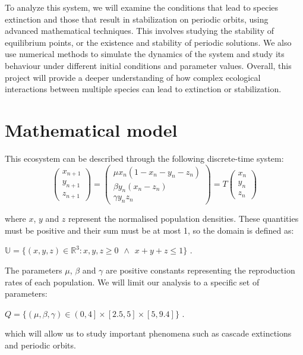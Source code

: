 \documentclass[10pt]{Configuration_Files/PoliMi3i_thesis}
\begin{document}
To analyze this system, we will examine the conditions that lead to species extinction and those that result in stabilization on periodic orbits, using advanced mathematical techniques. This involves studying the stability of equilibrium points, or the existence and stability of periodic solutions.
We also use numerical methods to simulate the dynamics of the system and study its behaviour under different initial conditions and parameter values. Overall, this project will provide a deeper understanding of how complex ecological interactions between multiple species can lead to extinction or stabilization.


\chapter{Mathematical model}
\label{ch:}
This ecosystem can be described through the following discrete-time system:
\begin{equation}
  \begin{pmatrix} x_{n+1}\\y_{n+1}\\z_{n+1}
\end{pmatrix}
=
\begin{pmatrix} \mu x_n (1-x_n-y_n-z_n)\\ \beta y_n (x_n - z_n)\\ \gamma y_n z_n
\end{pmatrix}
= T
\begin{pmatrix} x_{n}\\y_{n}\\z_{n}
\end{pmatrix}
\label{eq:eq1}
\end{equation}

where $x$, $y$ and $z$ represent the normalised population densities. These quantities must be positive and their sum must be at most 1, so the domain is defined as: 
\begin{center}
  $ \mathbb{U} = \{ \left ( x,y,z \right ) \in \mathbb{R}^3: x,y,z \ge 0 \hspace{5pt} \wedge \hspace{5pt} x+y+z \le 1 \} $ .
\end{center}

The parameters $\mu$, $\beta$ and $\gamma$ are positive constants representing the reproduction rates of each population. We will limit our analysis to a specific set of parameters: 
\begin{center}
 $Q = \{ \left (\mu, \beta, \gamma \right) \in \left (0,4 \right] \times \left [2.5,5 \right ]\times \left [5,9.4 \right ] \}$ .
\end{center}
which will allow us to study important phenomena such as cascade extinctions and periodic orbits.
\end{document}
